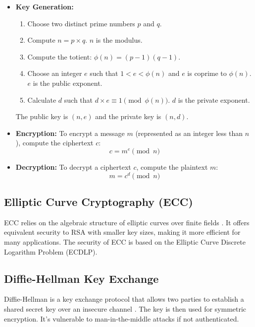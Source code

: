 \documentclass{report}
\begin{document}
\begin{itemize}
    \item \textbf{Key Generation:}
    \begin{enumerate}
        \item Choose two distinct prime numbers \(p\) and \(q\).
        \item Compute \(n = p \times q\).  \(n\) is the modulus.
        \item Compute the totient: \(\phi(n) = (p-1)(q-1)\).
        \item Choose an integer \(e\) such that \(1 < e < \phi(n)\) and \(e\) is coprime to \(\phi(n)\). \(e\) is the public exponent.
        \item Calculate \(d\) such that \(d \times e \equiv 1 \pmod{\phi(n)}\). \(d\) is the private exponent.
    \end{enumerate}
    The public key is \((n, e)\) and the private key is \((n, d)\).

    \item \textbf{Encryption:} To encrypt a message \(m\) (represented as an integer less than \(n\)), compute the ciphertext \(c\):
    \[c = m^e \pmod{n}\]

    \item \textbf{Decryption:} To decrypt a ciphertext \(c\), compute the plaintext \(m\):
    \[m = c^d \pmod{n}\]
\end{itemize}

\subsection{Elliptic Curve Cryptography (ECC)}
\label{subsec:ecc}

ECC relies on the algebraic structure of elliptic curves over finite fields \cite{koblitz_ecc}.  It offers equivalent security to RSA with smaller key sizes, making it more efficient for many applications. The security of ECC is based on the Elliptic Curve Discrete Logarithm Problem (ECDLP).

\subsection{Diffie-Hellman Key Exchange}
\label{subsec:diffie-hellman}

Diffie-Hellman is a key exchange protocol that allows two parties to establish a shared secret key over an insecure channel \cite{diffie_hellman}.  The key is then used for symmetric encryption.  It's vulnerable to man-in-the-middle attacks if not authenticated.
\end{document}
